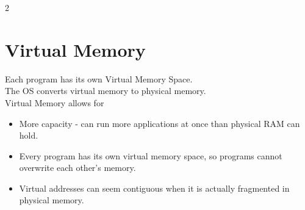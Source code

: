 \documentclass[10pt]{article}
\begin{document}
\begin{multicols}{2}
\section*{Virtual Memory}
{}
Each program has its own Virtual Memory Space.\\
The OS converts virtual memory to physical memory.\\
Virtual Memory allows for
\begin{itemize}
    \item More capacity - can run more applications at once than physical RAM can hold.
    \item Every program has its own virtual memory space, so programs cannot overwrite each other's memory.
    \item Virtual addresses can seem contiguous when it is actually fragmented in physical memory.
\end{itemize}

\end{multicols}
\end{document}

